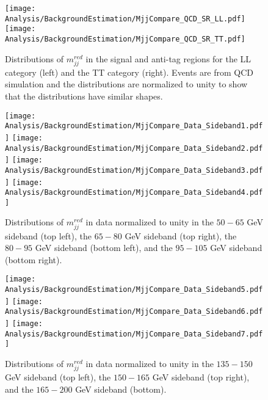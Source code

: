 \begin{figure}[h!]
\centering
\texttt{[image: Analysis/BackgroundEstimation/MjjCompare\_QCD\_SR\_LL.pdf]}
\texttt{[image: Analysis/BackgroundEstimation/MjjCompare\_QCD\_SR\_TT.pdf]}\\
  \caption{Distributions of $m_{jj}^{red}$ in the signal and anti-tag regions for the LL category (left) and the TT category (right). Events are from QCD simulation and the distributions are normalized to unity to show that the distributions have similar shapes.}
\label{fig:Mjj_HiggsWindow}
\end{figure}

\begin{figure}[h!]
\centering
\texttt{[image: Analysis/BackgroundEstimation/MjjCompare\_Data\_Sideband1.pdf]}
\texttt{[image: Analysis/BackgroundEstimation/MjjCompare\_Data\_Sideband2.pdf]}
\texttt{[image: Analysis/BackgroundEstimation/MjjCompare\_Data\_Sideband3.pdf]}
\texttt{[image: Analysis/BackgroundEstimation/MjjCompare\_Data\_Sideband4.pdf]}
\caption{Distributions of $m_{jj}^{red}$ in data normalized to unity in the $50-65$ GeV sideband (top left), the $65-80$ GeV sideband (top right), the $80-95$ GeV sideband (bottom left), and the $95-105$ GeV sideband (bottom right).}
\label{fig:MjjSidebands}
\end{figure}

\begin{figure}[h!]
\centering
\texttt{[image: Analysis/BackgroundEstimation/MjjCompare\_Data\_Sideband5.pdf]}
\texttt{[image: Analysis/BackgroundEstimation/MjjCompare\_Data\_Sideband6.pdf]}
\texttt{[image: Analysis/BackgroundEstimation/MjjCompare\_Data\_Sideband7.pdf]}
\caption{Distributions of $m_{jj}^{red}$ in data normalized to unity in the $135-150$ GeV sideband (top left), the $150-165$ GeV sideband (top right), and the $165-200$ GeV sideband (bottom).}
\label{fig:MjjSidebands_2}
\end{figure}

